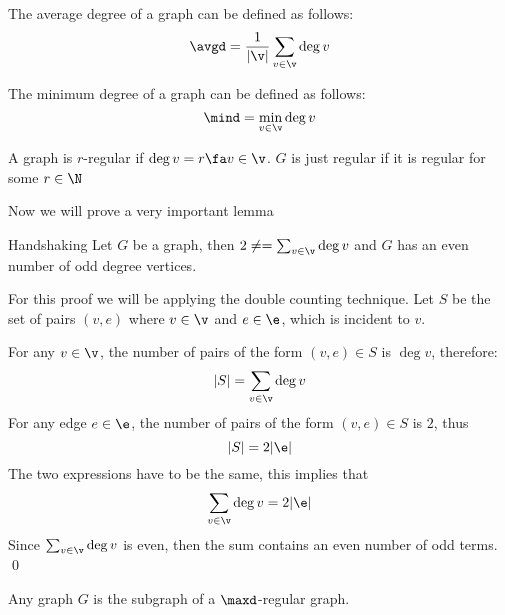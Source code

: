 \begin{definition}
    The average degree of a graph can be defined as follows:
    \begin{equation*}
        \avgd = \frac{1}{|\v|}\sum_{v \in \v}\deg{v}
    \end{equation*}
\end{definition}
\begin{definition}
    The minimum degree of a graph can be defined as follows:
    \begin{equation*}
        \mind = \min_{v \in \v}\deg{v}
    \end{equation*}
\end{definition}
\begin{definition}
    A graph is $r$-regular if $\deg{v} = r \fa v \in \v$. $G$ is just regular if it is regular for some $r \in \N$
\end{definition}
Now we will prove a very important lemma
\begin{customlemma}{Handshaking}
    \label{lemma:handshaking}
    Let $G$ be a graph, then $2\ne = \sum_{v \in \v}\deg{v}$ and $G$ has an even number of odd degree vertices.
\end{customlemma}
\begin{prf}
    For this proof we will be applying the double counting technique. Let $S$ be the set of pairs $(v, e)$ where $v \in \v$ and $e \in \e$, which is incident to $v$.

    For any $v \in \v$, the number of pairs of the form $(v, e) \in S$ is $\deg{v}$, therefore:
    \begin{equation*}
        |S| = \sum_{v \in \v}\deg{v}
    \end{equation*}
    For any edge $e \in \e$, the number of pairs of the form $(v, e) \in S$ is $2$, thus
    \begin{equation*}
        |S| = 2|\e|
    \end{equation*}
    The two expressions have to be the same, this implies that
    \begin{equation*}
        \sum_{v \in \v}\deg{v} = 2|\e|
    \end{equation*}
    Since $\sum_{v \in \v}\deg{v}$ is even, then the sum contains an even number of odd terms. \qed
\end{prf}
\begin{customproposition}{1.4}
    \label{proposition:1.4}
    Any graph $G$ is the subgraph of a $\maxd$-regular graph.
\end{customproposition}
